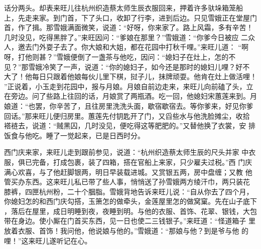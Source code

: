 话分两头。却表来旺儿往杭州织造蔡太师生辰衣服回来，押着许多驮垛箱笼船
上，先走来家。到门首，下了头口，收卸了行李，进到后边。只见雪娥正在堂屋门
首，作了揖。那雪娥满面微笑，说道：“好呀，你来家了。路上风霜，多有辛苦！
几时没见，吃得黑胖了。”来旺因问：“爹娘在那里？”雪娥道：“你爹今日被应
二众人，邀去门外耍子去了。你大娘和大姐，都在花园中打秋千哩。”来旺儿道：
“啊呀，打他则甚？”雪娥便倒了一盏茶与他吃，因问：“媳妇子在灶上，怎的不
见？”那雪娥冷笑了一声，说道：“你的媳妇子，如今还是那时的媳妇儿哩？好不
大了！他每日只跟着他娘每伙儿里下棋，挝子儿，抹牌顽耍。他肯在灶上做活哩！
”正说着，小玉走到花园中，报与月娘。月娘自前边走来，来旺儿向前磕了头，立
在旁边。问了些路上往回的话，月娘赏了两瓶酒。吃一回，他媳妇宋蕙莲来到。月
娘道：“也罢，你辛苦了，且往房里洗洗头面，歇宿歇宿去。等你爹来，好见你爹
回话。”那来旺儿便归房里。蕙莲先付钥匙开了门，又舀些水与他洗脸摊尘，收拾
褡裢去，说道：“贼黑囚，几时没见，便吃得这等肥肥的。”又替他换了衣裳，安
排饭食与他吃。睡了一觉起来，已是日西时分。

西门庆来家，来旺儿走到跟前参见，说道：“杭州织造蔡太师生辰的尺头并家
中衣服，俱已完备，打成包裹，装了四箱，搭在官船上来家，只少雇夫过税。”西
门庆满心欢喜，与了他赶脚银两，明日早装载进城。又赏银五两，房中盘缠；又教
他管买办东西。这来旺儿私已带了些人事，悄悄送了孙雪娥两方绫汗巾，两只装花
膝裤，四匣杭州粉，二十个胭脂。雪娥背地告诉来旺儿说：“自从你去了四个月，
你媳妇怎的和西门庆勾搭，玉箫怎的做牵头，金莲屋里怎的做窝窠。先在山子底下
，落后在屋里，成日明睡到夜，夜睡到明。与他的衣服、首饰、花翠、银钱，大包
带在身边。使小厮在门首买东西，见一日也使二三钱银子。”来旺道：“怪道箱子
里放着衣服、首饰！我问他，他说娘与他的。”雪娥道：“那娘与他？到是爷与他
的哩！”这来旺儿遂听记在心。

